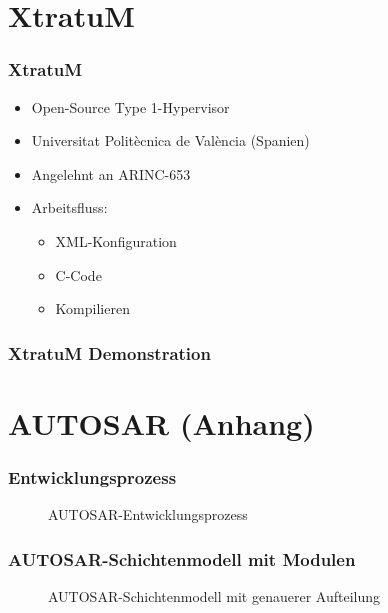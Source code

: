 \documentclass[]{beamer}
\newcommand{\inputImage}[1]{}
\begin{document}
\section*{XtratuM}
\label{sec:XtratuM_anhang}

\begin{frame}
\frametitle{XtratuM}
    \begin{itemize}
        \item Open-Source Type 1-Hypervisor
        \item Universitat Politècnica de València (Spanien)
        \item Angelehnt an ARINC-653
        \item Arbeitsfluss:
        \begin{itemize}
            \item XML-Konfiguration
            \item C-Code
            \item Kompilieren
        \end{itemize}
    \end{itemize}
\end{frame}

\begin{frame}
\frametitle{XtratuM Demonstration}

\end{frame}



\section*{AUTOSAR (Anhang)}
\label{sec:autosar_anhang}


\begin{frame}
\frametitle{Entwicklungsprozess}
    \begin{figure}[ht]
        \centering
        \resizebox{0.98\linewidth}{!}{\inputImage{Autosar_Prozess.dia}}
        \caption{AUTOSAR-Entwicklungsprozess}
        \label{fig:autosar_prozess}
    \end{figure}
\end{frame}

\begin{frame}
\frametitle{AUTOSAR-Schichtenmodell mit Modulen}
    \begin{figure}[ht]
        \centering
        \resizebox{0.98\linewidth}{!}{\inputImage{autosar_refined_layer.dia}}
        \caption{AUTOSAR-Schichtenmodell mit genauerer Aufteilung}
        \label{fig:autosar_refined_layer}
    \end{figure}
\end{frame}
\end{document}
